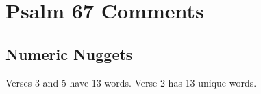 \section{Psalm 67 Comments}

\subsection{Numeric Nuggets}
Verses 3 and 5 have 13 words. Verse 2 has 13 unique words.